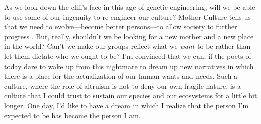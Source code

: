 \documentclass{article}
\begin{document}
As we look down the cliff's face in this age of genetic engineering, will we be
able to use some of our ingenuity to re-engineer our culture? Mother Culture
tells us that we need to evolve---become better persons---to allow society to
further progress \citep{quinn1992}. But, really, shouldn't we be looking for a
new mother and a new place in the world? Can't we make our groups reflect what
we \textit{want} to be rather than let them dictate who we ought to be? I'm
convinced that we can, if the poets of today dare to wake up from this
nightmare to dream up new narratives in which there is a place for the
actualization of our human wants and needs. Such a culture, where the role of
altruism is not to deny our own fragile nature, is a culture that I could trust
to sustain our species and our ecosystems for a little bit longer. One day, I'd
like to have a dream in which I realize that the person I'm expected to be has
become the person I am.





\end{document}
